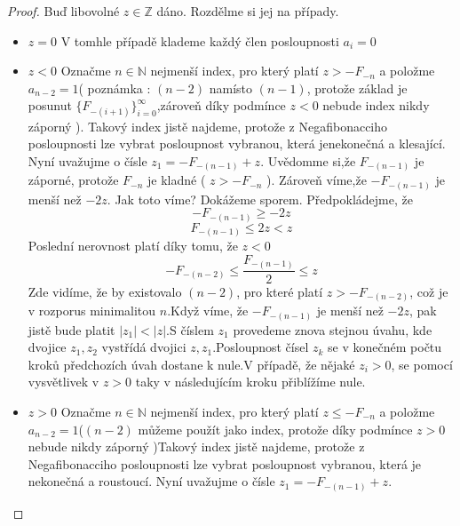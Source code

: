 \documentclass[czech,bachelor,dept470,male]{diploma}
\begin{document}
\begin{proof}\label{fiboDF}
	Buď libovolné $z\in\mathbb{Z}$ dáno. Rozdělme si jej na případy.
	\begin{itemize}
		\item $z=0$ V tomhle případě klademe každý člen posloupnosti $a_i = 0$
		\item $z<0$ Označme $n \in \mathbb{N}$ nejmenší index, pro který platí $z>-F_{-n}$ a položme $a_{n-2}=1$\newline ( poznámka : $(n-2)$ namísto $(n-1)$, protože základ je posunut $\{F_{-(i+1)}\}_{i=0}^{\infty}$,\newline zároveň díky podmínce $z<0$ nebude index nikdy záporný ). Takový index jistě najdeme, protože z Negafibonacciho posloupnosti lze vybrat posloupnost vybranou, která je\newline nekonečná a klesající. Nyní uvažujme o čísle $z_{1} = -F_{-(n-1)}+z$.
		      Uvědomme si,\newline že $F_{-(n-1)}$ je záporné, protože $F_{-n}$ je kladné ( $z>-F_{-n}$ ). Zároveň víme,\newline že $-F_{-(n-1)}$ je menší než $-2z$. Jak toto víme? Dokážeme sporem. Předpokládejme, že
		      $$-F_{-(n-1)} \ge -2z$$
		      $$F_{-(n-1)} \le 2z < z$$Poslední nerovnost platí díky tomu, že $z < 0$
		      $$-F_{-(n-2)}\le\frac{F_{-(n-1)}}{2}\le z$$
		      Zde vidíme, že by existovalo $(n-2)$, pro které platí $z>-F_{-(n-2)}$, což je v rozporu\newline s minimalitou $n$.\newline Když víme, že $-F_{-(n-1)}$ je menší než $-2z$, pak jistě bude platit $|z_1|<|z|$.\newline S číslem $z_1$ provedeme znova stejnou úvahu, kde dvojice $z_1,z_2$ vystřídá dvojici $z, z_1$.\newline Posloupnost čísel $z_{k}$ se v konečném počtu kroků předchozích úvah dostane k nule.\newline V případě, že nějaké $z_i > 0$, se pomocí vysvětlivek v $z>0$ taky v následujícím kroku přiblížíme nule.
		\item $z>0$ Označme $n \in \mathbb{N}$ nejmenší index, pro který platí $z\le-F_{-n}$ a položme $a_{n-2}=1$\newline ($(n-2)$ můžeme použít jako index, protože díky podmínce $z>0$ nebude nikdy záporný )\newline Takový index jistě najdeme, protože z Negafibonacciho posloupnosti lze vybrat posloupnost vybranou, která je nekonečná a roustoucí. Nyní uvažujme o čísle $z_{1} = -F_{-(n-1)}+z$.

\end{itemize}
\end{proof}
\end{document}
